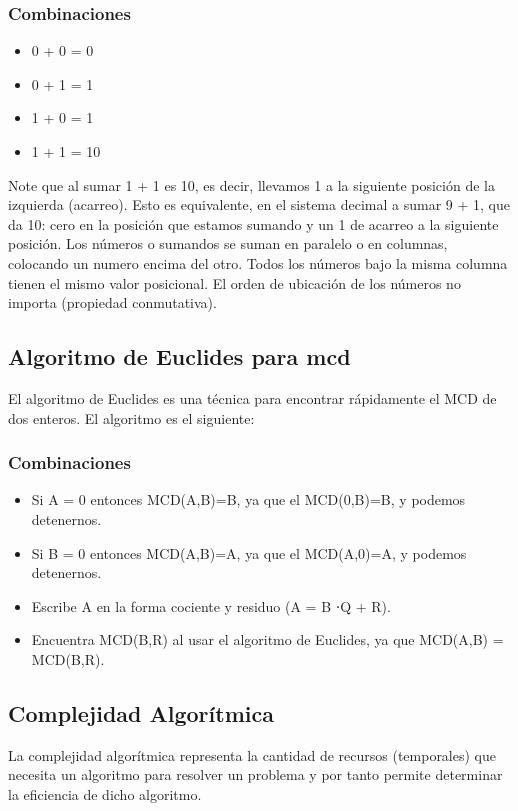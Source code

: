\documentclass[12pt,twoside]{article}
\begin{document}
\subsubsection{Combinaciones}
\begin{itemize}
\item 0 + 0 = 0
\item 0 + 1 = 1 
\item 1 + 0 = 1
\item 1 + 1 = 10
\end{itemize}
Note que al sumar 1 + 1 es  10, es decir, llevamos 1 a la siguiente posición de  la  izquierda  (acarreo).  Esto  es  equivalente,  en  el  sistema  decimal  a sumar  9  +  1,  que  da  10:  cero  en  la  posición  que  estamos  sumando  y  un 1 de acarreo a la siguiente posición.
\newline Los números o sumandos se suman en paralelo o en columnas, colocando un numero encima del otro. Todos los números bajo la misma columna tienen el mismo valor posicional.
\newline El orden de ubicación de los números no importa (propiedad conmutativa).

\subsection{Algoritmo de Euclides para mcd}
El algoritmo de Euclides es una técnica para encontrar rápidamente el MCD de dos enteros. El algoritmo es el siguiente:
\subsubsection{Combinaciones}
\begin{itemize}
\item Si A = 0 entonces MCD(A,B)=B, ya que el MCD(0,B)=B, y podemos detenernos.
\item Si B = 0 entonces MCD(A,B)=A, ya que el MCD(A,0)=A, y podemos detenernos. 
\item Escribe A en la forma cociente y residuo (A = B ⋅Q + R).
\item Encuentra MCD(B,R) al usar el algoritmo de Euclides, ya que MCD(A,B) = MCD(B,R).
\end{itemize}

\subsection{Complejidad Algor\'itmica}
La complejidad algorítmica representa la cantidad de recursos (temporales) que necesita un algoritmo para resolver un
problema y por tanto permite determinar la eficiencia de dicho algoritmo.
\end{document}

